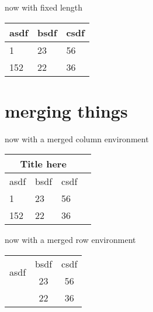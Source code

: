 \documentclass[12pt]{report}
\begin{document}
now with fixed length
\begin{center}
\begin{tabular}{||m{5em} | m{1cm}| m{1cm} ||} %
\hline 
asdf & bsdf & csdf \\
\hline \hline 
1 & 23 & 56 \\
\hline 
152 & 22 & 36 \\
\hline 
\end{tabular}
\end{center}

\section{merging things}
now with a merged column environment
\begin{center}
\begin{tabular}{|p{3cm}||p{3cm}|p{3cm}|p{3cm}|} 
\hline
\multicolumn{3}{|c|}{Title here}\\
\hline 
asdf & bsdf & csdf \\
\hline \hline 
1 & 23 & 56 \\
\hline 
152 & 22 & 36 \\
\hline 
\end{tabular}
\end{center}

now with a merged row environment
\begin{center}
\begin{tabular}{||| c | c | c ||} %
\hline 
\multirow{2}{4em}{asdf} & bsdf & csdf \\
 & 23 & 56 \\ 
 \hline
 & 22 & 36 \\ 
 \hline
\end{tabular}
\end{center}

\pagebreak 
\end{document}
